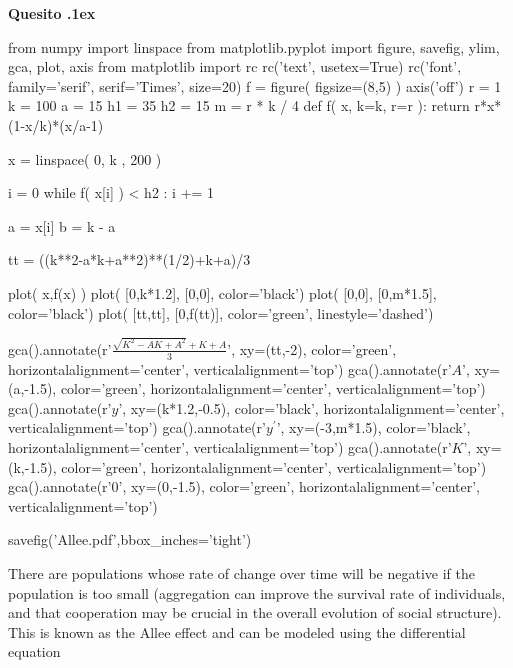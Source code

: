 \documentclass[11pt,twoside,a4paper]{article}
\newcounter{quesito}
\newenvironment{question}{\bigskip\addtocounter{quesito}{1}\bigskip\bigskip\par\textbf{Quesito \thequesito.\kern1ex}}{\vspace{\parskip}}
\begin{document}
\clearpage
\begin{question}
\begin{pycode}
from numpy import linspace
from matplotlib.pyplot import figure, savefig, ylim, gca, plot, axis
from matplotlib import rc
rc('text', usetex=True)
rc('font', family='serif', serif='Times', size=20)
f = figure( figsize=(8,5) )
axis('off')
r = 1
k = 100
a = 15
h1 = 35
h2 = 15
m = r * k / 4
def f( x, k=k, r=r ):
    return r*x*(1-x/k)*(x/a-1)

x   = linspace( 0, k , 200 )

i = 0
while f( x[i] ) < h2  : 
    i += 1
    
a = x[i]
b = k - a

tt = ((k**2-a*k+a**2)**(1/2)+k+a)/3



plot( x,f(x) )
plot(  [0,k*1.2], [0,0], color='black')
plot(  [0,0], [0,m*1.5], color='black')
plot( [tt,tt], [0,f(tt)], color='green', linestyle='dashed')

gca().annotate(r'$\frac{\sqrt{K^2-AK+A^2}+K+A}{3}$', 
                    xy=(tt,-2), 
                    color='green', 
                    horizontalalignment='center',  
                    verticalalignment='top')
gca().annotate(r'$A$', 
                    xy=(a,-1.5), 
                    color='green', 
                    horizontalalignment='center',  
                    verticalalignment='top')
gca().annotate(r'$y$',
                    xy=(k*1.2,-0.5), 
                    color='black', 
                    horizontalalignment='center',  
                    verticalalignment='top')
gca().annotate(r'$y^\prime$', 
                    xy=(-3,m*1.5), 
                    color='black', 
                    horizontalalignment='center',  
                    verticalalignment='top')
gca().annotate(r'$K$', 
                    xy=(k,-1.5), 
                    color='green',
                    horizontalalignment='center',  
                    verticalalignment='top')
gca().annotate(r'$0$', 
                    xy=(0,-1.5), 
                    color='green', 
                    horizontalalignment='center',  
                    verticalalignment='top')

savefig('Allee.pdf',bbox_inches='tight')
\end{pycode}



There are populations whose rate of change over time will be negative if the population is too small (aggregation can improve the survival rate of individuals, and that cooperation may be crucial in the overall evolution of social structure). This is known as the Allee effect and can be modeled using the differential equation


\end{question}
\end{document}
